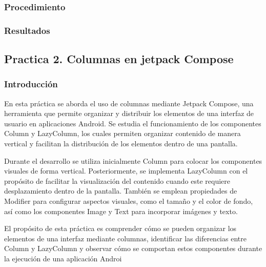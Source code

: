 \documentclass[12pt,a4paper]{article}
\begin{document}
\subsubsection{Procedimiento}

\subsubsection{Resultados}

\subsection{Practica 2. Columnas en jetpack Compose}

\subsubsection{Introducción}
En esta práctica se aborda el uso de columnas mediante Jetpack Compose, una herramienta que permite organizar y distribuir los elementos de una interfaz de usuario en aplicaciones Android. Se estudia el funcionamiento de los componentes Column y LazyColumn, los cuales permiten organizar contenido de manera vertical y facilitan la distribución de los elementos dentro de una pantalla.

Durante el desarrollo se utiliza inicialmente Column para colocar los componentes visuales de forma vertical. Posteriormente, se implementa LazyColumn con el propósito de facilitar la visualización del contenido cuando este requiere desplazamiento dentro de la pantalla. También se emplean propiedades de Modifier para configurar aspectos visuales, como el tamaño y el color de fondo, así como los componentes Image y Text para incorporar imágenes y texto.

El propósito de esta práctica es comprender cómo se pueden organizar los elementos de una interfaz mediante columnas, identificar las diferencias entre Column y LazyColumn y observar cómo se comportan estos componentes durante la ejecución de una aplicación Androi
\end{document}
